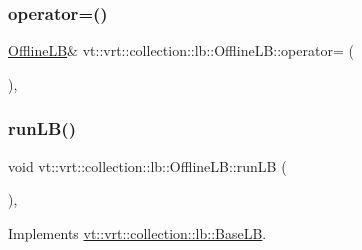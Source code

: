 \mbox{\label{structvt_1_1vrt_1_1collection_1_1lb_1_1_offline_l_b_a2d6408b68d2f1eb5b59d78715e0915d5}} 
\subsubsection{\texorpdfstring{operator=()}{operator=()}\hspace{0.1cm}{\footnotesize\ttfamily [2/2]}}
{\footnotesize\ttfamily \hyperlink{structvt_1_1vrt_1_1collection_1_1lb_1_1_offline_l_b}{Offline\+LB}\& vt\+::vrt\+::collection\+::lb\+::\+Offline\+L\+B\+::operator= (\begin{DoxyParamCaption}\item[{\hyperlink{structvt_1_1vrt_1_1collection_1_1lb_1_1_offline_l_b}{Offline\+LB} \&\&}]{ }\end{DoxyParamCaption})\hspace{0.3cm}{\ttfamily [default]}, {\ttfamily [noexcept]}}

\mbox{\label{structvt_1_1vrt_1_1collection_1_1lb_1_1_offline_l_b_a8621ca0e36932e4271f62d9d8078bf3e}} 
\subsubsection{\texorpdfstring{run\+L\+B()}{runLB()}}
{\footnotesize\ttfamily void vt\+::vrt\+::collection\+::lb\+::\+Offline\+L\+B\+::run\+LB (\begin{DoxyParamCaption}\item[{\hyperlink{namespacevt_a876a9d0cd5a952859c72de8a46881442}{Time\+Type}}]{ }\end{DoxyParamCaption})\hspace{0.3cm}{\ttfamily [override]}, {\ttfamily [virtual]}}



Implements \hyperlink{structvt_1_1vrt_1_1collection_1_1lb_1_1_base_l_b_a7caaf2483f046927fd7534a084a8c1b2}{vt\+::vrt\+::collection\+::lb\+::\+Base\+LB}.



